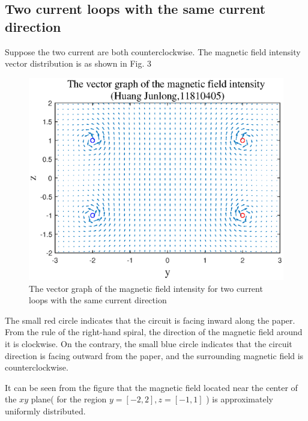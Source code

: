 \documentclass[journal,twocolumn,letterpaper]{IEEEJERM}
\begin{document}
\subsection{Two current loops with the same current direction}
Suppose the two current are both counterclockwise. The magnetic field intensity vector distribution is as shown in Fig. 3
\begin{figure}[H]   
	\centering	        \includegraphics[width=0.9\linewidth]{F1-1.eps}
	\caption{The vector graph of the magnetic field intensity for two current loops with the same current direction}	  
	\label{fig3} 
\end{figure}
The small red circle indicates that the circuit is facing inward along the paper. From the rule of the right-hand spiral, the direction of the magnetic field around it is clockwise. On the contrary, the small blue circle indicates that the circuit direction is facing outward from the paper, and the surrounding magnetic field is counterclockwise. 

It can be seen from the figure that the magnetic field located near the center of the $ xy $ plane( for the region $ y=[-2,2], z=[-1,1] $ ) is approximately uniformly distributed.
\end{document}
